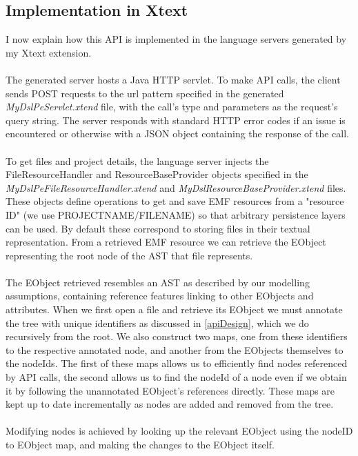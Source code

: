 \documentclass{article}
\begin{document}
{\subsection{Implementation in Xtext}
I now explain how this API is implemented in the language servers generated by my Xtext extension.
\\
\\
The generated server hosts a Java HTTP servlet. To make API calls, the client sends POST requests to the url pattern specified in the generated \emph{MyDslPeServlet.xtend} file, with the call's type and parameters as the request's query string. The server responds with standard HTTP error codes if an issue is encountered or otherwise with a JSON object containing the response of the call.
\\
\\
To get files and project details, the language server injects the FileResourceHandler and ResourceBaseProvider objects specified in the \emph{MyDslPeFileResourceHandler.xtend} and \emph{MyDslResourceBaseProvider.xtend} files. These objects define operations to get and save EMF resources from a "resource ID" (we use PROJECTNAME/FILENAME) so that arbitrary persistence layers can be used. By default these correspond to storing files in their textual representation. From a retrieved EMF resource we can retrieve the EObject representing the root node of the AST that file represents.
\\
\\
The EObject retrieved resembles an AST as described by our modelling assumptions, containing reference features linking to other EObjects and attributes. When we first open a file and retrieve its EObject we must annotate the tree with unique identifiers as discussed in \ref{apiDesign}, which we do recursively from the root. We also construct two maps, one from these identifiers to the respective annotated node, and another from the EObjects themselves to the nodeIds. The first of these maps allows us to efficiently find nodes referenced by API calls, the second allows us to find the nodeId of a node even if we obtain it by following the unannotated EObject's references directly. These maps are kept up to date incrementally as nodes are added and removed from the tree.
\\
\\
Modifying nodes is achieved by looking up the relevant EObject using the nodeID to EObject map, and making the changes to the EObject itself.
\\
\\
}
\end{document}

